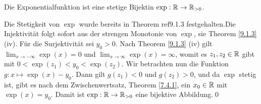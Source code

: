 \begin{subtheorem}
	Die Exponentialfunktion ist eine stetige Bijektin $ \exp : \mathbb{R} \to \mathbb{R}_{>0}  $.
\end{subtheorem}
\begin{subproof*}
	Die Stetigkeit von $ \exp  $ wurde bereits in Theorem ref{9.1.3} festgehalten.Die Injektivität folgt sofort aus der strengen Monotonie von $ \exp  $, sie Theorem \ref{9.1.3} (iv).
	Für die Surjektivität sei $ y_0 > 0 $.
	Nach Theorem \ref{9.1.3} (iv) gilt $ \lim_{x \to -\infty} \exp (x) = 0 $ und $ \lim_{x \to \infty} \exp (x) = \infty $, womit es $ z_1, z_2 \in \mathbb{R}  $ gibt mit $ 0 < \exp (z_1) < y_0 < \exp (z_2) $.
	Wir betrachten nun die Funktion $ g : x \mapsto \exp (x) - y_0 $. Dann gilt $ g(z_1) < 0 $ und $ g(z_2) > 0 $, und da $ \exp  $ stetig ist, gibt es nach dem Zwischenwertsatz, Theorem \ref{7.4.1}, ein $ x_0 \in \mathbb{R}  $ mit $ \exp (x) = y_0 $. Damit ist $ \exp  : \mathbb{R} \to \mathbb{R}_{>0}  $ eine bijektive Abbildung.\qed
\end{subproof*}


